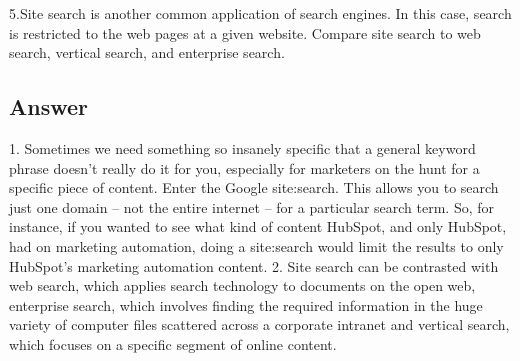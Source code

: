 \documentclass[letterpaper,11pt]{article}
\begin{document}
5.Site search is another common application of search engines. In this case, search is restricted to the web pages at a given website. Compare site search to web search, vertical search, and enterprise search. 


\subsection*{Answer}

1. Sometimes we need something so insanely specific that a general keyword phrase doesn't really do it for you, especially for marketers on the hunt for a specific piece of content. Enter the Google site:search. This allows you to search just one domain -- not the entire internet -- for a particular search term. So, for instance, if you wanted to see what kind of content HubSpot, and only HubSpot, had on marketing automation, doing a site:search would limit the results to only HubSpot's marketing automation content.
2. Site search can be contrasted with web search, which applies search technology to documents on the open web, enterprise search, which involves finding the required information in the huge variety of computer files scattered across a corporate intranet and vertical search, which focuses on a specific segment of online content.
\end{document}
